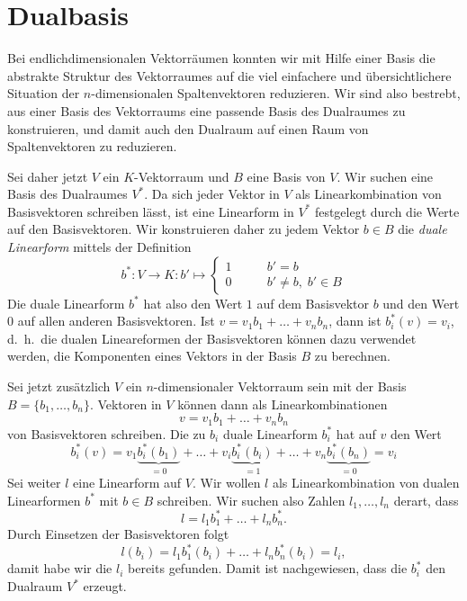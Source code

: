 %
%
%
\section{Dualbasis}
Bei endlichdimensionalen Vektorräumen konnten wir mit Hilfe einer Basis
die abstrakte Struktur des Vektorraumes auf die viel einfachere und
übersichtlichere Situation der $n$-dimensionalen Spaltenvektoren 
reduzieren.
Wir sind also bestrebt, aus einer Basis des Vektorraums eine passende
Basis des Dualraumes zu konstruieren, und damit auch den
Dualraum auf einen Raum von Spaltenvektoren zu reduzieren.

Sei daher jetzt $V$ ein $K$-Vektorraum und $B$ eine Basis von $V$.
Wir suchen eine Basis des Dualraumes $V^*$.
Da sich jeder Vektor in $V$ als Linearkombination von Basisvektoren
schreiben lässt, ist eine Linearform in $V^*$ festgelegt durch die Werte
auf den Basisvektoren.
Wir konstruieren daher zu jedem Vektor $b\in B$ die {\em duale Linearform}
mittels der Definition
\begin{equation}
b^*\colon V\to K:b'\mapsto
\begin{cases}
1&\qquad b'=b\\
0&\qquad b'\ne b,\; b'\in B
\end{cases}
\label{dualraum:dualeform}
\end{equation}
Die duale Linearform $b^*$ hat also den Wert $1$ auf dem Basisvektor $b$
und den Wert $0$ auf allen anderen Basisvektoren.
Ist $v=v_1b_1+\dots+v_nb_n$, dann ist
$b_i^*(v)=v_i$, d.~h.~die dualen Lineareformen der Basisvektoren können
dazu verwendet werden, die Komponenten eines Vektors in der Basis $B$
zu berechnen.

Sei jetzt zusätzlich $V$ ein $n$-dimensionaler Vektorraum sein mit
der Basis $B=\{b_1,\dots,b_n\}$.
Vektoren in $V$ können dann als Linearkombinationen 
\[
v=v_1b_1+\dots+v_nb_n
\]
von Basisvektoren schreiben.
Die zu $b_i$ duale Linearform $b_i^*$ hat auf $v$ den Wert
\[
b_i^*(v)
=
v_1\underbrace{b_i^*(b_1)}_{\displaystyle=0}
+
\dots
+
v_i\underbrace{b_i^*(b_i)}_{\displaystyle=1}
+
\dots
+
v_n\underbrace{b_i^*(b_n)}_{\displaystyle=0}
=
v_i
\]
Sei weiter $l$ eine Linearform auf $V$.
Wir wollen $l$ als Linearkombination von dualen Linearformen $b^*$
mit $b\in B$ schreiben.
Wir suchen also Zahlen $l_1,\dots,l_n$ derart, dass
\[
l = l_1b_1^* + \dots + l_nb_n^*.
\]
Durch Einsetzen der Basisvektoren folgt
\[
l(b_i)
=
l_1b_1^*(b_i) + \dots + l_nb_n^*(b_i)
=
l_i,
\]
damit habe wir die $l_i$ bereits gefunden.
Damit ist nachgewiesen, dass die $b_i^*$ den Dualraum $V^*$ erzeugt.

